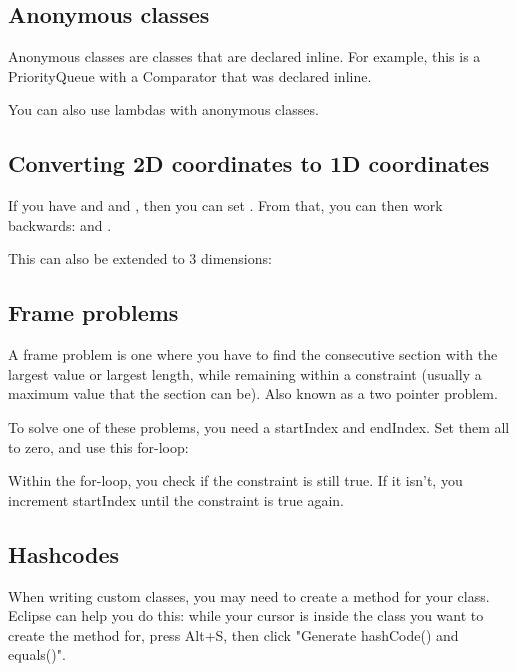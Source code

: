 
\subsection*{Anonymous classes}

Anonymous classes are classes that are declared inline. For example, this is a PriorityQueue with a Comparator that was declared inline.



You can also use lambdas with anonymous classes.



\subsection*{Converting 2D coordinates to 1D coordinates}

If you have  and  and , then you can set . From that, you can then work backwards:  and .

This can also be extended to 3 dimensions: 

\subsection*{Frame problems}

A frame problem is one where you have to find the consecutive section with the largest value or largest length, while remaining within a constraint (usually a maximum value that the section can be). Also known as a two pointer problem.

To solve one of these problems, you need a startIndex and endIndex. Set them all to zero, and use this for-loop: 

Within the for-loop, you check if the constraint is still true. If it isn't, you increment startIndex until the constraint is true again.

\subsection*{Hashcodes}

When writing custom classes, you may need to create a  method for your class. Eclipse can help you do this: while your cursor is inside the class you want to create the method for, press Alt+S, then click "Generate hashCode() and equals()".

